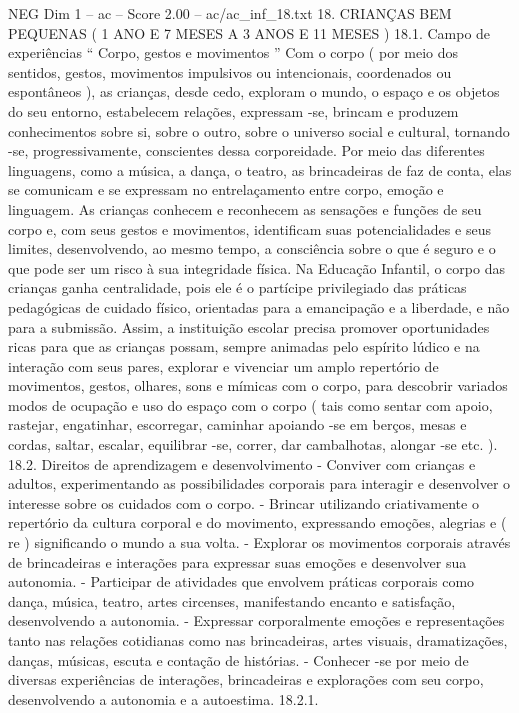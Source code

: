 \begin{textsample}{NEG Dim 1 – ac – Score 2.00 – ac/ac\_inf\_18.txt}  \label{ex:f1_neg_113}
18.
CRIANÇAS BEM PEQUENAS ( 1 ANO E 7 MESES A 3 ANOS E 11 MESES ) 18.1.
Campo de experiências “ Corpo, gestos e movimentos ” Com o corpo ( por meio dos sentidos, gestos, movimentos impulsivos ou intencionais, coordenados ou espontâneos ), as crianças, desde cedo, exploram o mundo, o espaço e os objetos do seu entorno, estabelecem relações, expressam -se, brincam e produzem conhecimentos sobre si, sobre o outro, sobre o universo social e cultural, tornando -se, progressivamente, conscientes dessa corporeidade.
Por meio das diferentes linguagens, como a música, a dança, o teatro, as brincadeiras de faz de conta, elas se comunicam e se expressam no entrelaçamento entre corpo, emoção e linguagem.
As crianças conhecem e reconhecem as sensações e funções de seu corpo e, com seus gestos e movimentos, identificam suas potencialidades e seus limites, desenvolvendo, ao mesmo tempo, a consciência sobre o que é seguro e o que pode ser um risco à sua integridade física.
Na Educação Infantil, o corpo das crianças ganha centralidade, pois ele é o partícipe privilegiado das práticas pedagógicas de cuidado físico, orientadas para a emancipação e a liberdade, e não para a submissão.
Assim, a instituição escolar precisa promover oportunidades ricas para que as crianças possam, sempre animadas pelo espírito lúdico e na interação com seus pares, explorar e vivenciar um amplo repertório de movimentos, gestos, olhares, sons e mímicas com o corpo, para descobrir variados modos de ocupação e uso do espaço com o corpo ( tais como sentar com apoio, rastejar, engatinhar, escorregar, caminhar apoiando -se em berços, mesas e cordas, saltar, escalar, equilibrar -se, correr, dar cambalhotas, alongar -se etc. ). 18.2.
Direitos de aprendizagem e desenvolvimento - Conviver com crianças e adultos, experimentando as possibilidades corporais para interagir e desenvolver o interesse sobre os cuidados com o corpo. - Brincar utilizando criativamente o repertório da cultura corporal e do movimento, expressando emoções, alegrias e ( re ) significando o mundo a sua volta. - Explorar os movimentos corporais através de brincadeiras e interações para expressar suas emoções e desenvolver sua autonomia. - Participar de atividades que envolvem práticas corporais como dança, música, teatro, artes circenses, manifestando encanto e satisfação, desenvolvendo a autonomia. - Expressar corporalmente emoções e representações tanto nas relações cotidianas como nas brincadeiras, artes visuais, dramatizações, danças, músicas, escuta e contação de histórias. - Conhecer -se por meio de diversas experiências de interações, brincadeiras e explorações com seu corpo, desenvolvendo a autonomia e a autoestima. 18.2.1.

\end{textsample}
